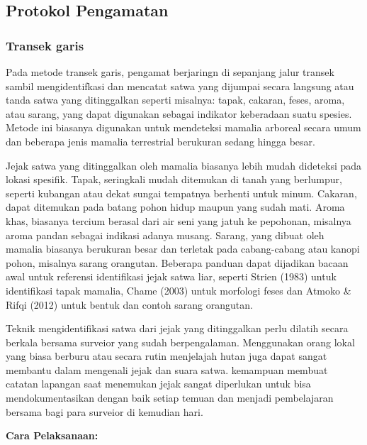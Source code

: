 \documentclass[
]{book}
\begin{document}
\hypertarget{protokol-pengamatan-2}{%
\subsection*{Protokol Pengamatan}\label{protokol-pengamatan-2}}

\hypertarget{transek-garis}{%
\subsubsection*{Transek garis}\label{transek-garis}}

Pada metode transek garis, pengamat berjaringn di sepanjang jalur transek sambil mengidentifkasi dan mencatat satwa yang dijumpai secara langsung atau tanda satwa yang ditinggalkan seperti misalnya: tapak, cakaran, feses, aroma, atau sarang, yang dapat digunakan sebagai indikator keberadaan suatu spesies. Metode ini biasanya digunakan untuk mendeteksi mamalia arboreal secara umum dan beberapa jenis mamalia terrestrial berukuran sedang hingga besar.

Jejak satwa yang ditinggalkan oleh mamalia biasanya lebih mudah dideteksi pada lokasi spesifik. Tapak, seringkali mudah ditemukan di tanah yang berlumpur, seperti kubangan atau dekat sungai tempatnya berhenti untuk minum. Cakaran, dapat ditemukan pada batang pohon hidup maupun yang sudah mati. Aroma khas, biasanya tercium berasal dari air seni yang jatuh ke pepohonan, misalnya aroma pandan sebagai indikasi adanya musang. Sarang, yang dibuat oleh mamalia biasanya berukuran besar dan terletak pada cabang-cabang atau kanopi pohon, misalnya sarang orangutan. Beberapa panduan dapat dijadikan bacaan awal untuk referensi identifikasi jejak satwa liar, seperti Strien (1983) untuk identifikasi tapak mamalia, Chame (2003) untuk morfologi feses dan Atmoko \& Rifqi (2012) untuk bentuk dan contoh sarang orangutan.

Teknik mengidentifikasi satwa dari jejak yang ditinggalkan perlu dilatih secara berkala bersama surveior yang sudah berpengalaman. Menggunakan orang lokal yang biasa berburu atau secara rutin menjelajah hutan juga dapat sangat membantu dalam mengenali jejak dan suara satwa. kemampuan membuat catatan lapangan saat menemukan jejak sangat diperlukan untuk bisa mendokumentasikan dengan baik setiap temuan dan menjadi pembelajaran bersama bagi para surveior di kemudian hari.

\textbf{Cara Pelaksanaan:}
\end{document}

